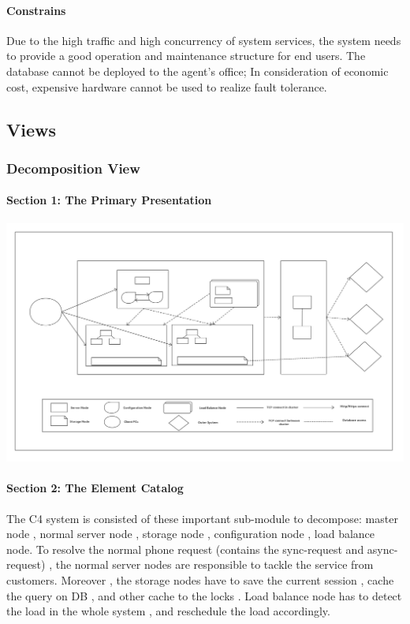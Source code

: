 \documentclass{article}
\begin{document}
	\paragraph{Constrains}
	Due to the high traffic and high concurrency of system services, the system needs to provide a good operation and maintenance structure for end users. The database cannot be deployed to the agent's office; In consideration of economic cost, expensive hardware cannot be used to realize fault tolerance.
	
	\subsection{Views}
		\subsubsection{Decomposition View} 
			\paragraph{Section 1: The Primary Presentation}
			\begin{center}
			\includegraphics[scale=0.15]{decom_section1.png}
			\end{center}
			\paragraph{Section 2: The Element Catalog}
			The C4 system is consisted of these important sub-module to decompose:  master node , normal server node , storage node , configuration node , load balance node. To resolve the normal phone request (contains the sync-request and async-request) , the normal server nodes are responsible to tackle the service from customers. Moreover , the storage nodes have to save the current session , cache the query on DB , and other cache to the locks . Load balance node has to detect the load in the whole system , and reschedule the load accordingly. 
\end{document}
